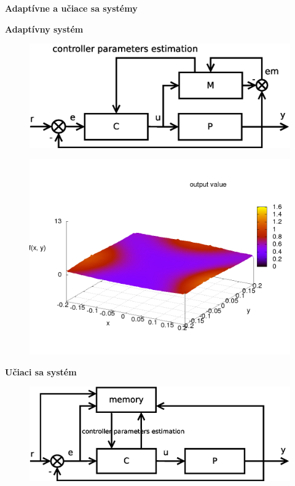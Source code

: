 \documentclass[xcolor=dvipsnames]{beamer}
\begin{document}
\begin{frame}{\bf Adaptívne a učiace sa systémy}

\begin{minipage}{.5\textwidth}
  {\bf Adaptívny systém}

  \begin{figure}[!htb]
  \centering
  \includegraphics[scale=.25]{../diagrams/adaptive_system.eps}
  \label{fig:adaptive_system}
  \end{figure}

  \begin{figure}[!htb]
  \centering
  \includegraphics[scale=.2]{../pictures/function_f1.png}
  \end{figure}

\end{minipage}%
\begin{minipage}{.5\textwidth}

  {\bf Učiaci sa systém}

  \begin{figure}[!htb]
  \centering
  \includegraphics[scale=.25]{../diagrams/learning_system.eps}
  \label{fig:learning_system}
  \end{figure}


\end{minipage}
\end{frame}
\end{document}
